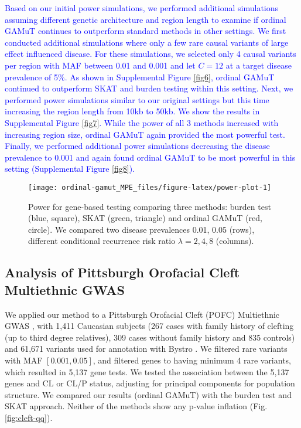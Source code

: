 \documentclass[]{article}
\begin{document}
\textcolor{blue}{Based on our initial power simulations, we performed additional simulations assuming different genetic architecture and region length to examine if ordinal GAMuT continues to outperform standard methods in other settings. We first conducted additional simulations where only a few rare causal variants of large effect influenced disease. For these simulations, we selected only 4 causal variants per region with MAF between 0.01 and 0.001 and let $C=12$ at a target disease prevalence of 5\%. As shown in Supplemental Figure \ref{fig6}, ordinal GAMuT continued to outperform SKAT and burden testing within this setting. Next, we performed power simulations similar to our original settings but this time increasing the region length from 10kb to 50kb. We show the results in Supplemental Figure \ref{fig7}. While the power of all 3 methods increased with increasing region size, ordinal GAMuT again provided the most powerful test. Finally, we performed additional power simulations decreasing the disease prevalence to 0.001 and again found ordinal GAMuT to be most powerful in this setting (Supplemental Figure \ref{fig8}).}

\begin{figure}

{\centering \texttt{[image: ordinal-gamut\_MPE\_files/figure-latex/power-plot-1]} 

}

\caption{Power for gene-based testing comparing three methods: burden test (blue, square), SKAT (green, triangle) and ordinal GAMuT (red, circle). We compared two disease prevalences 0.01, 0.05 (rows), different conditional recurrence risk ratio $\lambda=2,4,8$ (columns).}\label{fig:power-plot}
\end{figure}

\hypertarget{analysis-of-pittsburgh-orofacial-cleft-multiethnic-gwas-1}{%
\subsection{Analysis of Pittsburgh Orofacial Cleft Multiethnic GWAS}\label{analysis-of-pittsburgh-orofacial-cleft-multiethnic-gwas-1}}

We applied our method to a Pittsburgh Orofacial Cleft (POFC) Multiethnic GWAS \citep{Leslie2016}, \citep{Leslie2016b} with 1,411 Caucasian subjects (267 cases with family history of clefting (up to third degree relatives), 309 cases without family history and 835 controls) and 61,671 variants used for annotation with Bystro \citep{Kotlar2018}.
We filtered rare variants with MAF \([0.001,0.05]\), and filtered genes to having minimum 4 rare variants, which resulted in 5,137 gene tests.
We tested the association between the 5,137 genes and CL or CL/P status, adjusting for principal components for population structure. We compared our results (ordinal GAMuT) with the burden test and SKAT approach.
Neither of the methods show any p-value inflation (Fig. \ref{fig:cleft-qq}).
\end{document}
